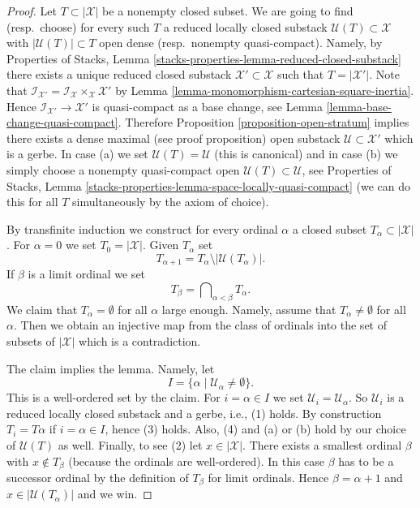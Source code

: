 \begin{proof}
Let $T \subset |\mathcal{X}|$ be a nonempty closed subset. We are going
to find (resp.\ choose) for every such $T$ a reduced locally closed substack
$\mathcal{U}(T) \subset \mathcal{X}$ with $|\mathcal{U}(T)| \subset T$
open dense (resp.\ nonempty quasi-compact). Namely, by
Properties of Stacks, Lemma
\ref{stacks-properties-lemma-reduced-closed-substack}
there exists a unique reduced closed substack
$\mathcal{X}' \subset \mathcal{X}$ such that $T = |\mathcal{X}'|$.
Note that $\mathcal{I}_{\mathcal{X}'} =
\mathcal{I}_\mathcal{X} \times_\mathcal{X} \mathcal{X}'$ by
Lemma \ref{lemma-monomorphism-cartesian-square-inertia}.
Hence $\mathcal{I}_{\mathcal{X}'} \to \mathcal{X}'$ is
quasi-compact as a base change, see
Lemma \ref{lemma-base-change-quasi-compact}.
Therefore
Proposition \ref{proposition-open-stratum}
implies there exists a dense maximal (see proof proposition)
open substack $\mathcal{U} \subset \mathcal{X}'$
which is a gerbe. In case (a) we set $\mathcal{U}(T) = \mathcal{U}$
(this is canonical) and in case (b) we simply choose a nonempty quasi-compact
open $\mathcal{U}(T) \subset \mathcal{U}$, see
Properties of Stacks, Lemma
\ref{stacks-properties-lemma-space-locally-quasi-compact}
(we can do this for all $T$
simultaneously by the axiom of choice).

\medskip\noindent
By transfinite induction we construct for every ordinal $\alpha$ a
closed subset $T_\alpha \subset |\mathcal{X}|$. For $\alpha = 0$
we set $T_0 = |\mathcal{X}|$. Given $T_\alpha$ set
$$
T_{\alpha + 1} = T_\alpha \setminus |\mathcal{U}(T_\alpha)|.
$$
If $\beta$ is a limit ordinal we set
$$
T_\beta = \bigcap\nolimits_{\alpha < \beta} T_\alpha.
$$
We claim that $T_\alpha = \emptyset$ for all $\alpha$
large enough. Namely, assume that $T_\alpha \not = \emptyset$
for all $\alpha$. Then we obtain an injective map from the class
of ordinals into the set of subsets of $|\mathcal{X}|$ which is a
contradiction.

\medskip\noindent
The claim implies the lemma. Namely, let
$$
I = \{\alpha \mid \mathcal{U}_\alpha \not = \emptyset \}.
$$
This is a well-ordered set by the claim. For $i = \alpha \in I$ we set
$\mathcal{U}_i = \mathcal{U}_\alpha$. So $\mathcal{U}_i$ is a reduced
locally closed substack and a gerbe, i.e., (1) holds. By construction
$T_i = T\alpha$ if $i = \alpha \in I$, hence (3) holds. Also, (4) and
(a) or (b) hold by our choice of $\mathcal{U}(T)$ as well. Finally, to see
(2) let $x \in |\mathcal{X}|$. There exists a smallest ordinal $\beta$
with $x \not \in T_\beta$ (because the ordinals are well-ordered).
In this case $\beta$ has to be a successor ordinal by the definition
of $T_\beta$ for limit ordinals. Hence $\beta = \alpha + 1$ and
$x \in |\mathcal{U}(T_\alpha)|$ and we win.
\end{proof}

